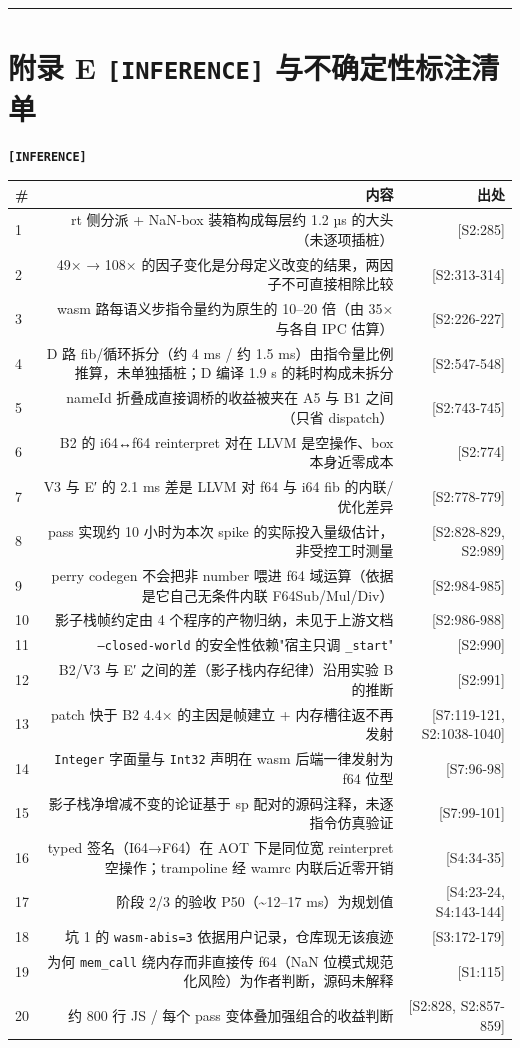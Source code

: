 \documentclass[11pt, a4paper]{article}
\begin{document}
\bigskip\hrule\bigskip

\section{附录 E \texttt{[INFERENCE]} 与不确定性标注清单}

\textbf{\texttt{[INFERENCE]}}


\begin{center}\small\begin{tabular}{lrr}
\toprule
\# & 内容 & 出处 \\
\midrule
1 & rt 侧分派 + NaN-box 装箱构成每层约 1.2 µs 的大头（未逐项插桩） & [S2:285] \\
2 & 49× → 108× 的因子变化是分母定义改变的结果，两因子不可直接相除比较 & [S2:313-314] \\
3 & wasm 路每语义步指令量约为原生的 10–20 倍（由 35× 与各自 IPC 估算） & [S2:226-227] \\
4 & D 路 fib/循环拆分（约 4 ms / 约 1.5 ms）由指令量比例推算，未单独插桩；D 编译 1.9 s 的耗时构成未拆分 & [S2:547-548] \\
5 & nameId 折叠成直接调桥的收益被夹在 A5 与 B1 之间（只省 dispatch） & [S2:743-745] \\
6 & B2 的 i64↔f64 reinterpret 对在 LLVM 是空操作、box 本身近零成本 & [S2:774] \\
7 & V3 与 E′ 的 2.1 ms 差是 LLVM 对 f64 与 i64 fib 的内联/优化差异 & [S2:778-779] \\
8 & pass 实现约 10 小时为本次 spike 的实际投入量级估计，非受控工时测量 & [S2:828-829, S2:989] \\
9 & perry codegen 不会把非 number 喂进 f64 域运算（依据是它自己无条件内联 F64Sub/Mul/Div） & [S2:984-985] \\
10 & 影子栈帧约定由 4 个程序的产物归纳，未见于上游文档 & [S2:986-988] \\
11 & \texttt{--closed-world} 的安全性依赖"宿主只调 \texttt{\_start}" & [S2:990] \\
12 & B2/V3 与 E′ 之间的差（影子栈内存纪律）沿用实验 B 的推断 & [S2:991] \\
13 & patch 快于 B2 4.4× 的主因是帧建立 + 内存槽往返不再发射 & [S7:119-121, S2:1038-1040] \\
14 & \texttt{Integer} 字面量与 \texttt{Int32} 声明在 wasm 后端一律发射为 f64 位型 & [S7:96-98] \\
15 & 影子栈净增减不变的论证基于 sp 配对的源码注释，未逐指令仿真验证 & [S7:99-101] \\
16 & typed 签名（I64→F64）在 AOT 下是同位宽 reinterpret 空操作；trampoline 经 wamrc 内联后近零开销 & [S4:34-35] \\
17 & 阶段 2/3 的验收 P50（\textasciitilde{}12–17 ms）为规划值 & [S4:23-24, S4:143-144] \\
18 & 坑 1 的 \texttt{wasm-abis=3} 依据用户记录，仓库现无该痕迹 & [S3:172-179] \\
19 & 为何 \texttt{mem\_call} 绕内存而非直接传 f64（NaN 位模式规范化风险）为作者判断，源码未解释 & [S1:115] \\
20 & 约 800 行 JS / 每个 pass 变体叠加强组合的收益判断 & [S2:828, S2:857-859] \\
\bottomrule
\end{tabular}\end{center}
\end{document}
